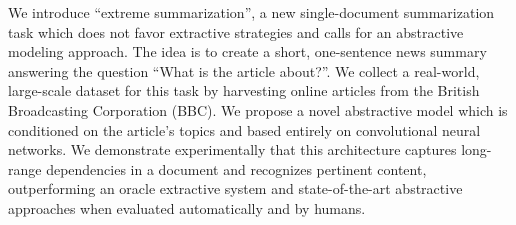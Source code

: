 We introduce ``extreme summarization'', a new single-document summarization task which does not favor extractive strategies and calls for an abstractive modeling approach. The idea is to create a short, one-sentence news summary answering the question ``What is the article about?''. We collect a real-world, large-scale dataset for this task by harvesting online articles from the British Broadcasting Corporation (BBC). We propose a novel abstractive model which is conditioned on the article's topics and based entirely on convolutional neural networks.  We demonstrate experimentally that this architecture captures long-range dependencies in a document and recognizes pertinent content, outperforming an oracle extractive system and state-of-the-art abstractive approaches when evaluated automatically and by humans.
